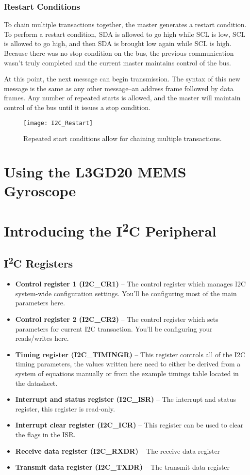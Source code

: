 \documentclass[11pt,fleqn]{book} %
\begin{document}
\subsubsection{Restart Conditions}
To chain multiple transactions together, the master generates a restart condition.
 To perform a restart condition, SDA is allowed to go high while SCL is low, SCL is allowed to go high, and then SDA is brought low again while SCL is high. Because there was no stop condition on the bus, the previous communication wasn’t truly completed and the current master maintains control of the bus.
 
 At this point, the next message can begin transmission. The syntax of this new message is the same as any other message–an address frame followed by data frames. Any number of repeated starts is allowed, and the master will maintain control of the bus until it issues a stop condition.
\begin{figure}[]
    \centering\texttt{[image: I2C\_Restart]}
    \caption{Repeated start conditions allow for chaining multiple transactions. }
    \label{restart}
\end{figure}

\section{Using the L3GD20 MEMS Gyroscope}

\section{Introducing the I\textsuperscript{2}C Peripheral}
\subsection{I\textsuperscript{2}C Registers}
\begin{itemize}
    \item \textbf{Control register 1 (I2C\_CR1)} -- The control register which manages I2C system-wide configuration settings. You'll be configuring most of the main parameters here.
    \item \textbf{Control register 2 (I2C\_CR2)} -- The control register which sets parameters for current I2C transaction. You'll be configuring your reads/writes here.
    \item \textbf{Timing register (I2C\_TIMINGR)} -- This register controls all of the I2C timing parameters, the values written here need to either be derived from a system of equations manually or from the example timings table located in the datasheet. 
    \item \textbf{Interrupt and status register (I2C\_ISR)} -- The interrupt and status register, this register is read-only.
    \item \textbf{Interrupt clear register (I2C\_ICR)} -- This register can be used to clear the flags in the ISR.
    \item \textbf{Receive data register (I2C\_RXDR)} -- The receive data register
    \item \textbf{Transmit data register (I2C\_TXDR)} -- The transmit data register
\end{itemize}
\end{document}
